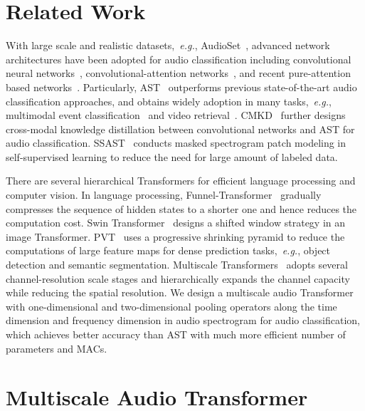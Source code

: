 \documentclass{article}
\def\eg{\emph{e.g.}}
\begin{document}
\section{Related Work}
\label{sec:related}
With large scale and realistic datasets,~\eg, AudioSet~\cite{gemmeke2017audio}, advanced network architectures have been adopted for audio classification including convolutional neural networks~\cite{kong2020panns,wang2019comparison}, convolutional-attention networks~\cite{gong2021psla,kong2020sound}, and recent pure-attention based networks~\cite{gong2021ast,chen2022hts}. Particularly, AST~\cite{gong2021ast} outperforms previous state-of-the-art audio classification approaches, and obtains widely adoption in many tasks,~\eg, multimodal event classification~\cite{zhumultiscale,zhuavt} and video retrieval~\cite{lin2022eclipse}. CMKD~\cite{gong2022cmkd} further designs cross-modal knowledge distillation between convolutional networks and AST for audio classification. SSAST~\cite{gong2022ssast} conducts masked spectrogram patch modeling in self-supervised learning to reduce the need for large amount of labeled data.  

There are several hierarchical Transformers for efficient language processing and computer vision. In language processing, Funnel-Transformer~\cite{dai2020funnel} gradually compresses the sequence of hidden states to a shorter one and hence reduces the computation cost. Swin Transformer~\cite{liu2021swin} designs a shifted window strategy in an image Transformer. PVT~\cite{wang2021pyramid} uses a progressive shrinking pyramid to reduce the computations of large feature maps for dense prediction tasks,~\eg, object detection and semantic segmentation. Multiscale Transformers~\cite{fan2021multiscale,li2021improved} adopts several channel-resolution scale stages and hierarchically expands the channel capacity while reducing the spatial resolution. We design a multiscale audio Transformer with one-dimensional and two-dimensional pooling operators along the time dimension and frequency dimension in audio spectrogram for audio classification, which achieves better accuracy than AST with much more efficient number of parameters and MACs.
\section{Multiscale Audio Transformer}
\label{sec:method}
\end{document}
